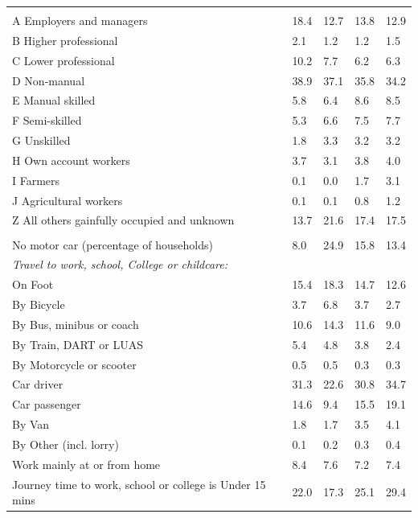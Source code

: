 \documentclass{article}
\begin{document}
\begin{table}[h]
\begin{tabular}{KTTTT}
\hline
    \\ 
    \hline
A Employers and managers & 18.4& 12.7& 13.8& 12.9\\
B Higher professional & 2.1& 1.2& 1.2& 1.5\\
C Lower professional & 10.2&  7.7&  6.2&  6.3\\
D Non-manual & 38.9& 37.1& 35.8& 34.2\\
E Manual skilled & 5.8& 6.4& 8.6& 8.5\\
F Semi-skilled & 5.3& 6.6& 7.5& 7.7\\
G Unskilled & 1.8& 3.3& 3.2& 3.2\\
H Own account workers & 3.7& 3.1& 3.8& 4.0\\
I Farmers & 0.1& 0.0& 1.7& 3.1\\
J Agricultural workers & 0.1& 0.1& 0.8& 1.2\\
Z All others gainfully occupied and unknown & 13.7& 21.6& 17.4& 17.5\\
\hline
{}\hline
    \\ 
    \hline
No motor car (percentage of households) &  8.0& 24.9& 15.8& 
13.4\\
    \hline 
\emph{Travel to work, school, College or childcare:} & & & \\
\quad On Foot & 15.4& 18.3& 14.7& 12.6\\ 
\quad By Bicycle & 3.7& 6.8& 3.7& 2.7\\ 
\quad By Bus, minibus or coach & 10.6& 14.3& 11.6&  9.0\\
\quad By Train, DART or LUAS & 5.4& 4.8& 3.8& 2.4\\
\quad By Motorcycle or scooter & 0.5& 0.5& 0.3& 0.3\\
\quad Car driver & 31.3 & 22.6& 30.8& 34.7\\
\quad Car passenger & 14.6&  9.4& 15.5& 19.1\\
\quad By Van & 1.8& 1.7& 3.5& 4.1\\
\quad By Other (incl. lorry) & 0.1& 0.2& 0.3& 0.4\\
    \hline
Work mainly at or from home & 8.4& 7.6& 7.2& 7.4\\
Journey time to work, school or college is Under 15 mins & 22.0& 17.3& 25.1& 29.4\\

\end{tabular}
\end{table}
\end{document}
